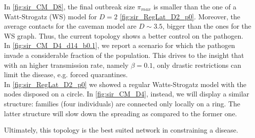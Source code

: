 \documentclass[a4paper,10pt, oneside]{book} %
\theoremstyle{definition}
\begin{document}
In \autoref{fig:sir_CM_D8}, the final outbreak size $\pi_{max}$ is smaller than the one of a Watt-Strogatz (WS) model for $ D = 2$ \autoref{fig:sir_RegLat_D2_p0}. Moreover, the average contacts for the caveman model are $ D \sim 3.5$, bigger than the ones for the WS graph. Thus, the current topology shows a better control on the pathogen.\\
In \autoref{fig:sir_CM_D4_d14_b0.1}, we report a scenario for which the pathogen invade a considerable fraction of the population. This drives to the insight that with an higher transmission rate, namely $ \beta = 0.1$, only drastic restrictions can limit the disease, e.g. forced quarantines. \\
In \autoref{fig:sir_RegLat_D2_p0} we showed a regular Watts-Strogatz model with the nodes disposed on a circle. In \autoref{fig:sir_CM_D4}, instead, we will display a similar structure: families (four individuals) are connected only locally on a ring. The latter structure will slow down the spreading as compared to the former one.

Ultimately, this topology is the best suited network in constraining a disease.
\end{document}
